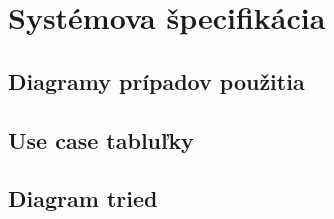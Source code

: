 \documentclass[12pt]{report}
\begin{document}
\chapter{Systémova špecifikácia}
\section{Diagramy prípadov použitia}

\section{Use case tabluľky}
\section{Diagram tried}

\end{document}
